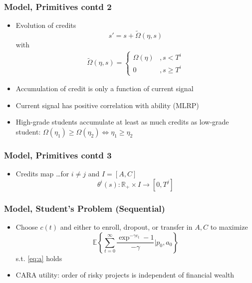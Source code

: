 \begin{frame}
	\frametitle{Model, Primitives contd 2}
		\begin{itemize}
			\item Evolution of credits
				\begin{equation}
					s' = s + \tilde{\Omega} (\eta, s)
				\end{equation}
\noindent with
				\begin{eqnarray}
					 \tilde{\Omega} (\eta, s) = 
					 	\begin{cases}
					 		\Omega(\eta) &, s < T^i \\
					 		0 &, s \geq T^i
					 	\end{cases}
				\end{eqnarray}
			\item Accumulation of credit is only a function of current signal
			\item Current signal has positive correlation with ability (MLRP)
			\item High-grade students accumulate at least as much credits as low-grade student: $\Omega(\eta_{1}) \geq \Omega(\eta_{2}) \Leftrightarrow \eta_{1} \geq \eta_{2}$
		\end{itemize}		 
\end{frame}

\begin{frame}
	\frametitle{Model, Primitives contd 3}
		\begin{itemize}
			\item Credits map \ldots for $i \neq j$ and $I = [A,C]$
				\begin{equation}
					\theta^i (s): \mathbb{R}_{+} \times I \rightarrow [0,T^j]
				\end{equation}
		\end{itemize}
\end{frame}

\begin{frame}
	\frametitle{Model, Student's Problem (Sequential)}
		\begin{itemize}
			\item Choose $c(t)$ and either to enroll, dropout, or transfer in $A,C$ to maximize
		\begin{equation}
			\mathbb{E} \left\{ \sum \limits _{t=0} ^{\infty}  \frac{\exp ^{- \gamma c_{t}} - 1}{- \gamma} | p_{0}, a_{0}  \right\}
		\end{equation}
\noindent s.t. \eqref{eq:a} holds
		\item CARA utility: order of risky projects is independent of financial wealth
		\end{itemize}
\end{frame}

